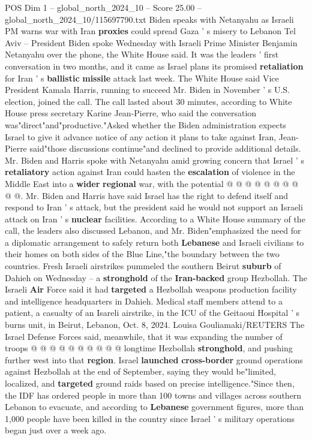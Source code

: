 \begin{textsample}{POS Dim 1 – global\_north\_2024\_10 – Score 25.00 – global\_north\_2024\_10/115697790.txt}  \label{ex:f1_pos_088}
Biden speaks with Netanyahu as Israeli PM warns war with Iran \textbf{proxies} could spread Gaza ' s misery to Lebanon Tel Aviv -- President Biden spoke Wednesday with Israeli Prime Minister Benjamin Netanyahu over the phone, the White House said.
It was the leaders ' first conversation in two months, and it came as Israel plans its promised \textbf{retaliation} for Iran ' s \textbf{ballistic} \textbf{missile} attack last week.
The White House said Vice President Kamala Harris, running to succeed Mr.
Biden in November ' s U.S. election, joined the call.
The call lasted about 30 minutes, according to White House press secretary Karine Jean-Pierre, who said the conversation was"direct"and"productive."Asked whether the Biden administration expects Israel to give it advance notice of any action it plans to take against Iran, Jean-Pierre said"those discussions continue"and declined to provide additional details.
Mr.
Biden and Harris spoke with Netanyahu amid growing concern that Israel ' s \textbf{retaliatory} action against Iran could hasten the \textbf{escalation} of violence in the Middle East into a \textbf{wider} \textbf{regional} war, with the potential @ @ @ @ @ @ @ @ @ @.
Mr.
Biden and Harris have said Israel has the right to defend itself and respond to Iran ' s attack, but the president said he would not support an Israeli attack on Iran ' s \textbf{nuclear} facilities.
According to a White House summary of the call, the leaders also discussed Lebanon, and Mr.
Biden"emphasized the need for a diplomatic arrangement to safely return both \textbf{Lebanese} and Israeli civilians to their homes on both sides of the Blue Line,"the boundary between the two countries.
Fresh Israeli airstrikes pummeled the southern Beirut \textbf{suburb} of Dahieh on Wednesday -- a \textbf{stronghold} of the \textbf{Iran-backed} group Hezbollah.
The Israeli \textbf{Air} Force said it had \textbf{targeted} a Hezbollah weapons production facility and intelligence headquarters in Dahieh.
Medical staff members attend to a patient, a casualty of an Isareli airstrike, in the ICU of the Geitaoui Hospital ' s burns unit, in Beirut, Lebanon, Oct. 8, 2024.
Louisa Gouliamaki/REUTERS The Israel Defense Forces said, meanwhile, that it was expanding the number of troops @ @ @ @ @ @ @ @ @ @ longtime Hezbollah \textbf{stronghold}, and pushing further west into that \textbf{region}.
Israel \textbf{launched} \textbf{cross-border} ground operations against Hezbollah at the end of September, saying they would be"limited, localized, and \textbf{targeted} ground raids based on precise intelligence."Since then, the IDF has ordered people in more than 100 towns and villages across southern Lebanon to evacuate, and according to \textbf{Lebanese} government figures, more than 1,000 people have been killed in the country since Israel ' s military operations began just over a week ago.

\end{textsample}
